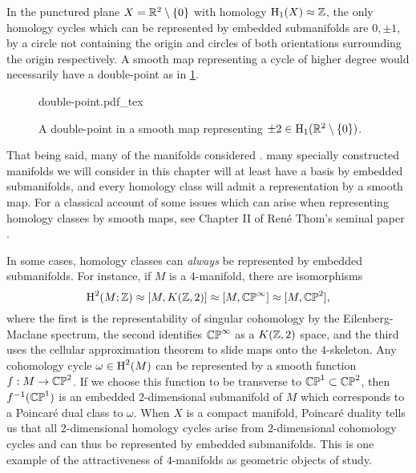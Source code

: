 \begin{example}
	In the punctured plane $X=\mathbb{R}^2\setminus \{0\}$ with homology $\operatorname{H}_1(X)\approx \mathbb{Z}$, the only homology cycles which can be represented by embedded submanifolds are $0,\pm 1$, by a circle not containing the origin and circles of both orientations surrounding the origin respectively. A smooth map representing a cycle of higher degree would necessarily have a double-point as in \cref{fig:double-point}.
\end{example}

\begin{figure}[ht]
	\centering
	{double-point.pdf_tex}
	\caption{A double-point in a smooth map representing $\pm 2\in \operatorname{H}_1(\mathbb{R}^2\setminus\{0\})$.}\label{fig:double-point}
\end{figure}

That being said, many of the manifolds considered .
many specially constructed manifolds we will consider in this chapter will at least have a basis by embedded submanifolds, and every homology class will admit a representation by a smooth map. For a classical account of some issues which can arise when representing homology classes by smooth maps, see Chapter II of Ren\'e Thom's seminal paper \cite{thom1954}.

\begin{remark}
	In some cases, homology classes can \emph{always} be represented by embedded submanifolds. For instance, if $M$ is a $4$-manifold, there are isomorphisms
	\begin{equation}
		\operatorname{H}^2(M; \mathbb{Z}) \approx [M, K(\mathbb{Z},2)] \approx [M, \mathbb{CP}^\infty] \approx [M,\mathbb{CP}^2],
	\end{equation}
	where the first is the representability of singular cohomology by the Eilenberg-Maclane spectrum, the second identifies $\mathbb{CP}^\infty$ as a $K(\mathbb{Z},2)$ space, and the third uses the cellular approximation theorem to slide maps onto the $4$-skeleton. Any cohomology cycle $\omega\in \operatorname{H}^2(M)$ can be represented by a smooth function $f : M \to \mathbb{CP}^2$. If we choose this function to be transverse to $\mathbb{CP}^1\subset \mathbb{CP}^2$, then $f^{-1}(\mathbb{CP}^1)$ is an embedded $2$-dimensional submanifold of $M$ which corresponds to a Poincar\'e dual class to $\omega$. When $X$ is a compact manifold, Poincar\'e duality tells us that all $2$-dimensional homology cycles arise from $2$-dimensional cohomology cycles and can thus be represented by embedded submanifolds. This is one example of the attractiveness of $4$-manifolds as geometric objects of study.
\end{remark}

